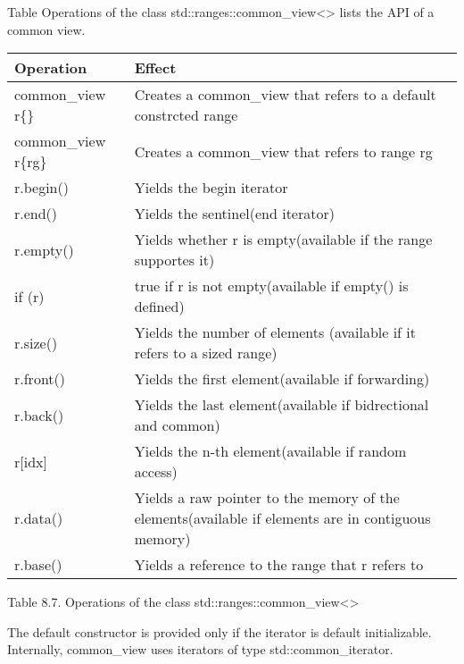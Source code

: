 
Table Operations of the class std::ranges::common\_view<> lists the API of a common view.


\begin{longtable}[c]{|l|l|}
\hline
\textbf{Operation}   & \textbf{Effect}                                                \\ \hline
\endfirsthead
%
\endhead
%
common\_view r\{\} & Creates a common\_view that refers to a default constrcted range                                   \\ \hline
common\_view r\{rg\} & Creates a common\_view that refers to range rg                 \\ \hline
r.begin()            & Yields the begin iterator                                      \\ \hline
r.end()              & Yields the sentinel(end iterator)                              \\ \hline
r.empty()            & Yields whether r is empty(available if the range supportes it) \\ \hline
if (r)               & true if r is not empty(available if empty() is defined)        \\ \hline
r.size()           & Yields the number of elements (available if it refers to a sized range)                            \\ \hline
r.front()            & Yields the first element(available if forwarding)              \\ \hline
r.back()             & Yields the last element(available if bidrectional and common)  \\ \hline
r{[}idx{]}           & Yields the n-th element(available if random access)            \\ \hline
r.data()           & Yields a raw pointer to the memory of the elements(available if elements are in contiguous memory) \\ \hline
r.base()             & Yields a reference to the range that r refers to               \\ \hline
\end{longtable}

\begin{center}
Table 8.7. Operations of the class std::ranges::common\_view<>
\end{center}

The default constructor is provided only if the iterator is default initializable. Internally, common\_view uses iterators of type std::common\_iterator.

